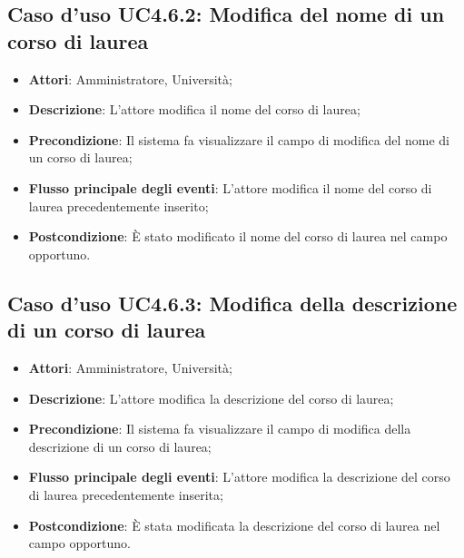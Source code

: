 \subsection{Caso d'uso \texorpdfstring{UC4.6.2}{UC4.6.2}: Modifica del nome di un corso di laurea}
\begin{itemize}
	\item \textbf{Attori}: Amministratore, Università;
	\item \textbf{Descrizione}: L'attore modifica il nome del corso di laurea;
	
	\item \textbf{Precondizione}: Il sistema fa visualizzare il campo di modifica del nome di un corso di laurea;
	
	\item \textbf{Flusso principale degli eventi}: L'attore modifica il nome del corso di laurea precedentemente inserito;
	
	\item \textbf{Postcondizione}: È stato modificato il nome del corso di laurea nel campo opportuno.
	
	
\end{itemize}
\subsection{Caso d'uso \texorpdfstring{UC4.6.3}{UC4.6.3}: Modifica della descrizione di un corso di laurea}
\begin{itemize}
	\item \textbf{Attori}: Amministratore, Università;
	\item \textbf{Descrizione}: L'attore modifica la descrizione del corso di laurea;
	
	\item \textbf{Precondizione}: Il sistema fa visualizzare il campo di modifica della descrizione di un corso di laurea;
	
	\item \textbf{Flusso principale degli eventi}: L'attore modifica la descrizione del corso di laurea precedentemente inserita;
	
	\item \textbf{Postcondizione}: È stata modificata la descrizione del corso di laurea nel campo opportuno.
	
\end{itemize}

